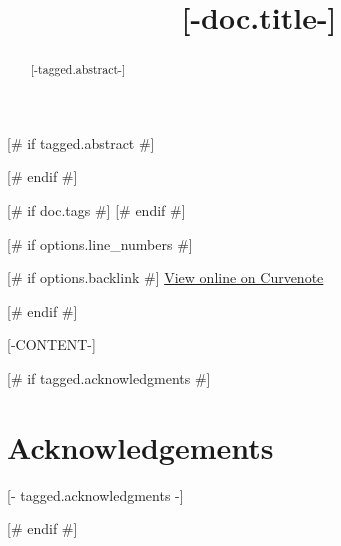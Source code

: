 \documentclass{article} %
\title{[-doc.title-]}
\author[[-loop.index-]]{[-author.name-][# if author.orcid #]\orcid[-ALPHA[loop.index]-]{}[# endif #]}
[# endfor #]
[# for author in doc.authors #]
\affil[[-loop.index-]]{[-author.affiliation-]}
[# endfor #]
\begin{document}
\maketitle

[# if tagged.abstract #]
\begin{abstract}
[-tagged.abstract-]\\
\end{abstract}
[# endif #]

[# if doc.tags #]
[# endif #]

\vspace{0.5cm}

[# if options.line_numbers #]\linenumbers[# endif #]

[# if options.backlink #]
\footnotesize
\href{[-doc.oxalink-]}{View online on Curvenote}

\normalsize
[# endif #]


[-CONTENT-]

[# if tagged.acknowledgments #]
\footnotesize
\section*{Acknowledgements}
[- tagged.acknowledgments -]

\normalsize
[# endif #]



\end{document}
